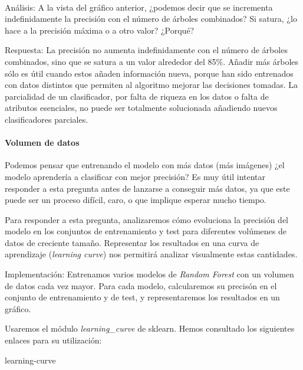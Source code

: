 \documentclass[11pt]{article}
\begin{document}
    \begin{center}
    \end{center}
    { \hspace*{\fill} \\}
    
    Análisis: A la vista del gráfico anterior, ¿podemos decir que se
incrementa indefinidamente la precisión con el número de árboles
combinados? Si satura, ¿lo hace a la precisión máxima o a otro valor?
¿Porqué?

    Respuesta: La precisión no aumenta indefinidamente con el número de
árboles combinados, sino que se satura a un valor alrededor del 85\%.
Añadir más árboles sólo es útil cuando estos añaden información nueva,
porque han sido entrenados con datos distintos que permiten al algoritmo
mejorar las decisiones tomadas. La parcialidad de un clasificador, por
falta de riqueza en los datos o falta de atributos esenciales, no puede
ser totalmente solucionada añadiendo nuevos clasificadores parciales.

    \hypertarget{volumen-de-datos}{%
\paragraph{Volumen de datos}\label{volumen-de-datos}}

    Podemos pensar que entrenando el modelo con más datos (más imágenes) ¿el
modelo aprendería a clasificar con mejor precisión? Es muy útil intentar
responder a esta pregunta antes de lanzarse a conseguir más datos, ya
que este puede ser un proceso difícil, caro, o que implique esperar
mucho tiempo.

Para responder a esta pregunta, analizaremos cómo evoluciona la
precisión del modelo en los conjuntos de entrenamiento y test para
diferentes volúmenes de datos de creciente tamaño. Representar los
resultados en una curva de aprendizaje (\emph{learning curve}) nos
permitirá analizar visualmente estas cantidades.

    Implementación: Entrenamos varios modelos de \emph{Random Forest} con un
volumen de datos cada vez mayor. Para cada modelo, calcularemos su
precisón en el conjunto de entrenamiento y de test, y representaremos
los resultados en un gráfico.

Usaremos el módulo \emph{learning\_curve} de sklearn. Hemos consultado
los siguientes enlaces para su utilización:

learning-curve
\end{document}
